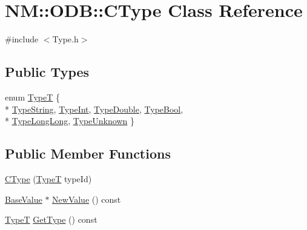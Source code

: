 \hypertarget{class_n_m_1_1_o_d_b_1_1_c_type}{}\section{N\+M\+:\+:O\+D\+B\+:\+:C\+Type Class Reference}
\label{class_n_m_1_1_o_d_b_1_1_c_type}


{\ttfamily \#include $<$Type.\+h$>$}

\subsection*{Public Types}
\begin{DoxyCompactItemize}
\item 
enum \hyperlink{class_n_m_1_1_o_d_b_1_1_c_type_ad03443dbcd5bbf2ab1dfe9380d11a467}{Type\+T} \{ \\*
\hyperlink{class_n_m_1_1_o_d_b_1_1_c_type_ad03443dbcd5bbf2ab1dfe9380d11a467a7bd366fd59966536fa54eec48aa4a6f1}{Type\+String}, 
\hyperlink{class_n_m_1_1_o_d_b_1_1_c_type_ad03443dbcd5bbf2ab1dfe9380d11a467adb9d62cd9449c0d8a8055c0c20b48e74}{Type\+Int}, 
\hyperlink{class_n_m_1_1_o_d_b_1_1_c_type_ad03443dbcd5bbf2ab1dfe9380d11a467aa3693e05157432fd1b3751a3db90bdcb}{Type\+Double}, 
\hyperlink{class_n_m_1_1_o_d_b_1_1_c_type_ad03443dbcd5bbf2ab1dfe9380d11a467ac8bf047e9d106e716f09563212dba857}{Type\+Bool}, 
\\*
\hyperlink{class_n_m_1_1_o_d_b_1_1_c_type_ad03443dbcd5bbf2ab1dfe9380d11a467ac613f7b8655fc11f65ed397408511e72}{Type\+Long\+Long}, 
\hyperlink{class_n_m_1_1_o_d_b_1_1_c_type_ad03443dbcd5bbf2ab1dfe9380d11a467adaec44260b368116ab95860d6dd6f53a}{Type\+Unknown}
 \}
\end{DoxyCompactItemize}
\subsection*{Public Member Functions}
\begin{DoxyCompactItemize}
\item 
\hyperlink{class_n_m_1_1_o_d_b_1_1_c_type_a4338d7f8f8f7bce6f3267765e0f51e2c}{C\+Type} (\hyperlink{class_n_m_1_1_o_d_b_1_1_c_type_ad03443dbcd5bbf2ab1dfe9380d11a467}{Type\+T} type\+Id)
\item 
\hyperlink{class_n_m_1_1_o_d_b_1_1_base_value}{Base\+Value} $\ast$ \hyperlink{class_n_m_1_1_o_d_b_1_1_c_type_a81631dd3561c7e1f95ef6760d970aa36}{New\+Value} () const 
\item 
\hyperlink{class_n_m_1_1_o_d_b_1_1_c_type_ad03443dbcd5bbf2ab1dfe9380d11a467}{Type\+T} \hyperlink{class_n_m_1_1_o_d_b_1_1_c_type_a7e03f63f7407e1987f31c72be68b0f23}{Get\+Type} () const 
\end{DoxyCompactItemize}
